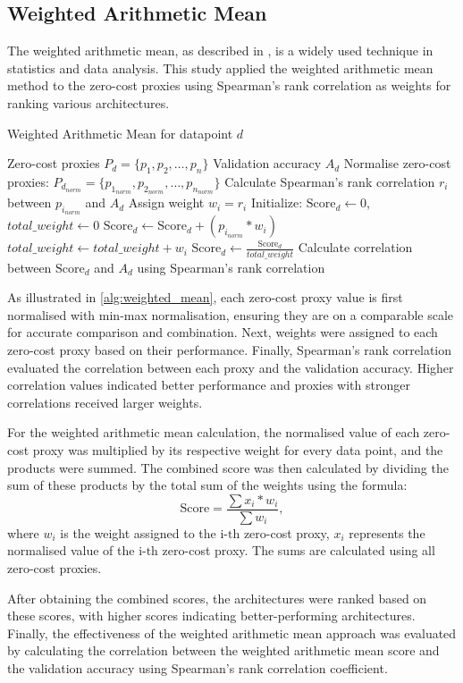 
\subsection{Weighted Arithmetic Mean}
The weighted arithmetic mean, as described in \autocite{wam}, is a widely used technique in statistics and data analysis. This study applied the weighted arithmetic mean method to the zero-cost proxies using Spearman's rank correlation as weights for ranking various architectures.

\begin{algorithm}
\caption{Weighted Arithmetic Mean for datapoint $d$}\label{alg:weighted_mean}
\begin{algorithmic}[1]
\Require Zero-cost proxies $P_d = \{p_1, p_2, \dots, p_n\}$
\Require Validation accuracy $A_d$
\State Normalise zero-cost proxies: $P_{d_{norm}} = \{p_{1_{norm}}, p_{2_{norm}}, \dots, p_{n_{norm}}\}$
    \State Calculate Spearman's rank correlation $r_i$ between $p_{i_{norm}}$ and $A_d$
    \State Assign weight $w_i = r_i$
\EndFor
\State Initialize: $\text{Score}_d \leftarrow 0$, $total\_weight \leftarrow 0$
    \State $\text{Score}_d \leftarrow \text{Score}_d + (p_{i_{norm}} * w_i)$
    \State $total\_weight \leftarrow total\_weight + w_i$
\EndFor
\State $\text{Score}_d \leftarrow \frac{\text{Score}_d}{total\_weight}$
\State Calculate correlation between $\text{Score}_d$ and $A_d$ using Spearman's rank correlation
\end{algorithmic}
\end{algorithm}


As illustrated in \cref{alg:weighted_mean}, each zero-cost proxy value is first normalised with min-max normalisation, ensuring they are on a comparable scale for accurate comparison and combination. Next, weights were assigned to each zero-cost proxy based on their performance. Finally, Spearman's rank correlation evaluated the correlation between each proxy and the validation accuracy. Higher correlation values indicated better performance and proxies with stronger correlations received larger weights.

For the weighted arithmetic mean calculation, the normalised value of each zero-cost proxy was multiplied by its respective weight for every data point, and the products were summed. The combined score was then calculated by dividing the sum of these products by the total sum of the weights using the formula: 
\begin{equation*} 
    \text{Score} = \frac{\sum x_i * w_i }{\sum w_i}, 
\end{equation*} 
where $w_i$ is the weight assigned to the $\text{i-th}$ zero-cost proxy, $x_i$ represents the normalised value of the $\text{i-th}$ zero-cost proxy. The sums are calculated using all zero-cost proxies.

After obtaining the combined scores, the architectures were ranked based on these scores, with higher scores indicating better-performing architectures. Finally, the effectiveness of the weighted arithmetic mean approach was evaluated by calculating the correlation between the weighted arithmetic mean score and the validation accuracy using Spearman's rank correlation coefficient.